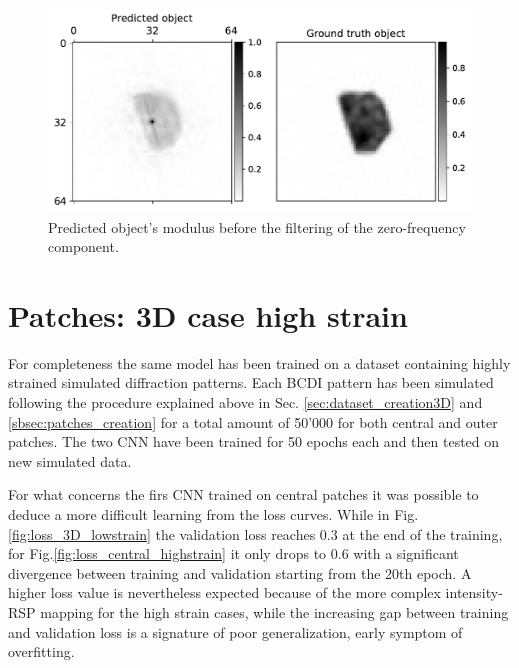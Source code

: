 \begin{figure}[H]
    \centering
    \includegraphics[width=\textwidth]{figures/Phasing/stitching_filtering.pdf}
    \caption{Predicted object's modulus before the filtering of the zero-frequency component.}
    \label{fig:stitching_filtering}
\end{figure}


\section{Patches: 3D case high strain}\label{chp:patches_strain}

For completeness the same model has been trained on a dataset containing highly strained simulated diffraction patterns. 
Each BCDI pattern has been simulated following the procedure explained above in Sec. \ref{sec:dataset_creation3D} and
 \ref{sbsec:patches_creation} for a total amount of 50'000 for both central and outer patches. The two CNN have been trained 
 for 50 epochs each and then tested on new simulated data. 

 For what concerns the firs CNN trained on central patches it was possible to deduce a more difficult learning from the 
 loss curves. While in Fig.\ref{fig:loss_3D_lowstrain} the validation loss reaches 0.3 at the end of the training, for 
Fig.\ref{fig:loss_central_highstrain} it only drops to 0.6 with a significant divergence between training and validation 
starting from the 20th epoch. A higher loss value is nevertheless expected because of the more complex intensity-RSP mapping 
for the high strain cases, while the increasing gap between training and validation loss is a signature of poor generalization, 
early symptom of overfitting. 

